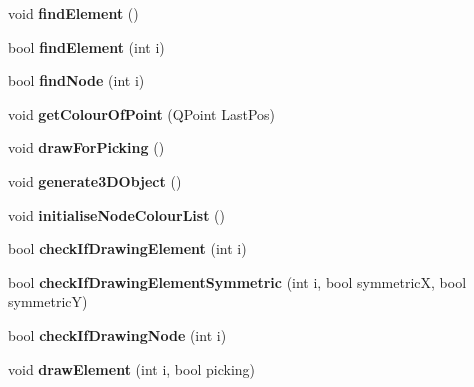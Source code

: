 \begin{DoxyCompactItemize}
\item 
\hypertarget{classGLWidget_a7fe217738ad7d4c54caa575068641234}{}void {\bfseries find\+Element} ()\label{classGLWidget_a7fe217738ad7d4c54caa575068641234}

\item 
\hypertarget{classGLWidget_aa1c349f897d0fee1163abba8fd39995c}{}bool {\bfseries find\+Element} (int i)\label{classGLWidget_aa1c349f897d0fee1163abba8fd39995c}

\item 
\hypertarget{classGLWidget_a7ff762be5c3562616b6cc4bc6d6b6683}{}bool {\bfseries find\+Node} (int i)\label{classGLWidget_a7ff762be5c3562616b6cc4bc6d6b6683}

\item 
\hypertarget{classGLWidget_afc09ab8fa7a8163ca1b69e7953e33dc4}{}void {\bfseries get\+Colour\+Of\+Point} (Q\+Point Last\+Pos)\label{classGLWidget_afc09ab8fa7a8163ca1b69e7953e33dc4}

\item 
\hypertarget{classGLWidget_a218fadfeda519fd8a120b702f04771c8}{}void {\bfseries draw\+For\+Picking} ()\label{classGLWidget_a218fadfeda519fd8a120b702f04771c8}

\item 
\hypertarget{classGLWidget_a1f66af8462807ed77b878cba3e60bbb9}{}void {\bfseries generate3\+D\+Object} ()\label{classGLWidget_a1f66af8462807ed77b878cba3e60bbb9}

\item 
\hypertarget{classGLWidget_a30be9e529d717552be70cbad097d99e8}{}void {\bfseries initialise\+Node\+Colour\+List} ()\label{classGLWidget_a30be9e529d717552be70cbad097d99e8}

\item 
\hypertarget{classGLWidget_a8597de4600272fb1720641fd1990f153}{}bool {\bfseries check\+If\+Drawing\+Element} (int i)\label{classGLWidget_a8597de4600272fb1720641fd1990f153}

\item 
\hypertarget{classGLWidget_a95a5dc2578aeaf9df7127c0af7d1a531}{}bool {\bfseries check\+If\+Drawing\+Element\+Symmetric} (int i, bool symmetric\+X, bool symmetric\+Y)\label{classGLWidget_a95a5dc2578aeaf9df7127c0af7d1a531}

\item 
\hypertarget{classGLWidget_a4e843eda050d818414f6c722f806cf88}{}bool {\bfseries check\+If\+Drawing\+Node} (int i)\label{classGLWidget_a4e843eda050d818414f6c722f806cf88}

\item 
\hypertarget{classGLWidget_aa85fc1e14fb11fc62ce93cc72ffb5a61}{}void {\bfseries draw\+Element} (int i, bool picking)\label{classGLWidget_aa85fc1e14fb11fc62ce93cc72ffb5a61}


\end{DoxyCompactItemize}
